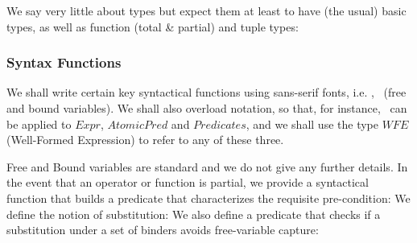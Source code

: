 We say very little about types but expect them at least
to have (the usual) basic types, as well as function (total \& partial)
and tuple types:

\subsubsection{Syntax Functions}

We shall write certain key syntactical functions
using sans-serif fonts, i.e.
\fv, \bv\ (free and bound variables).
We shall also overload notation, so that, for instance,
\fv\ can be applied to $Expr$, $AtomicPred$ and $Predicates$,
and we shall use the type $WFE$ (Well-Formed Expression)
to refer to any of these three.

Free and Bound variables are standard and we do not give
any further details.
In the event that an operator or function is partial,
we provide a syntactical function
that builds a predicate that characterizes the requisite pre-condition:
We define the notion of substitution:
We also define a predicate that checks if a substitution under a set of binders
avoids free-variable capture:

